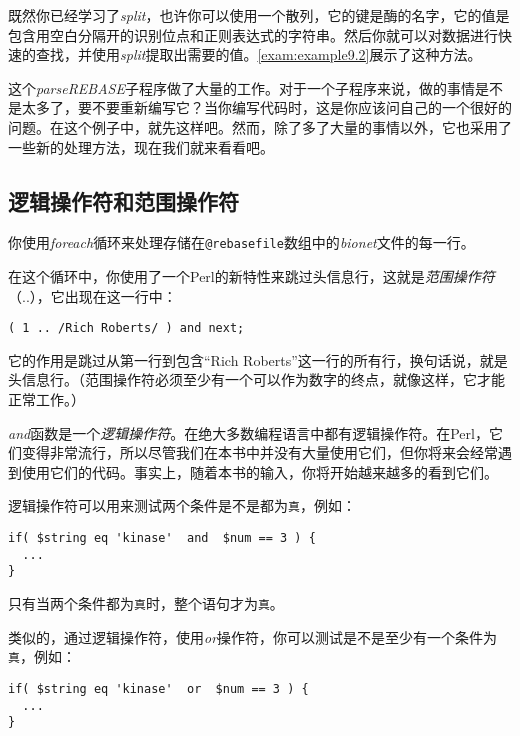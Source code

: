 既然你已经学习了\textit{split}，也许你可以使用一个散列，它的键是酶的名字，它的值是包含用空白分隔开的识别位点和正则表达式的字符串。然后你就可以对数据进行快速的查找，并使用\textit{split}提取出需要的值。\autoref{exam:example9.2}展示了这种方法。



这个\textit{parseREBASE}子程序做了大量的工作。对于一个子程序来说，做的事情是不是太多了，要不要重新编写它？当你编写代码时，这是你应该问自己的一个很好的问题。在这个例子中，就先这样吧。然而，除了多了大量的事情以外，它也采用了一些新的处理方法，现在我们就来看看吧。

\subsection{逻辑操作符和范围操作符}
你使用\textit{foreach}循环来处理存储在\verb|@rebasefile|数组中的\textit{bionet}文件的每一行。

在这个循环中，你使用了一个Perl的新特性来跳过头信息行，这就是\textit{范围操作符}（..），它出现在这一行中：

\begin{lstlisting}
( 1 .. /Rich Roberts/ ) and next;
\end{lstlisting}

它的作用是跳过从第一行到包含“Rich Roberts”这一行的所有行，换句话说，就是头信息行。（范围操作符必须至少有一个可以作为数字的终点，就像这样，它才能正常工作。）

\textit{and}函数是一个\textit{逻辑操作符}。在绝大多数编程语言中都有逻辑操作符。在Perl，它们变得非常流行，所以尽管我们在本书中并没有大量使用它们，但你将来会经常遇到使用它们的代码。事实上，随着本书的输入，你将开始越来越多的看到它们。

逻辑操作符可以用来测试两个条件是不是都为\verb|真|，例如：

\begin{lstlisting}
if( $string eq 'kinase'  and  $num == 3 ) {
  ...
}
\end{lstlisting}

只有当两个条件都为\verb|真|时，整个语句才为\verb|真|。

类似的，通过逻辑操作符，使用\textit{or}操作符，你可以测试是不是至少有一个条件为\verb|真|，例如：

\begin{lstlisting}
if( $string eq 'kinase'  or  $num == 3 ) {
  ...
}
\end{lstlisting}

